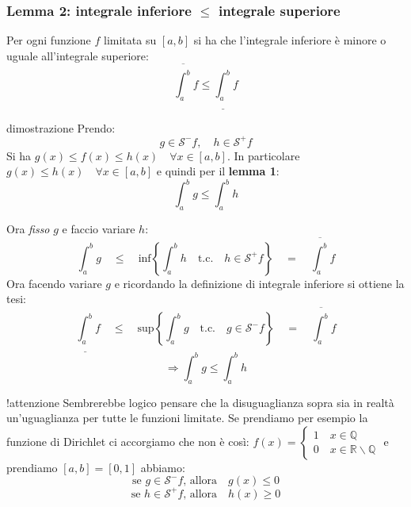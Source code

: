 \documentclass[x11names]{article}
\begin{document}
	\begin{center}
		\colorbox{myred}{\begin{minipage}{5.75in}
				\begin{redes}{}
					\subsubsection{Lemma 2: integrale inferiore $\leq$ integrale superiore}
					Per ogni funzione $f$ limitata su $\left[a,b\right]$ si ha che l'integrale inferiore è minore o uguale all'integrale superiore:
					\[
					\overline{\int_{a}^{b}}f \leq \underline{\int_{a}^{b}}f
					\]
				\end{redes}
		\end{minipage}}        
	\end{center}
	\begin{es}{dimostrazione}
		Prendo:
		\[
		g \in \mathcal{S}^-f, \quad h \in \mathcal{S}^+f
		\]
		Si ha $g(x) \leq f(x) \leq h(x) \quad \forall x \in [a,b]$. In particolare $g(x) \leq h(x) \quad \forall x \in [a,b]$ e quindi per il \textbf{lemma 1}:
		\[
		\int_{a}^{b}g \leq \int_{a}^{b}h 
		\]
		
		Ora \textit{fisso} $g$ e faccio variare $h$:
		\[
		\int_{a}^{b}g \quad \leq \quad \text{inf}\left\{\int_{a}^{b}h \quad \text{t.c.} \quad h \in \mathcal{S}^+f\right\} \quad = \quad \overline{\int_{a}^{b}}f
		\]
		Ora facendo variare $g$ e ricordando la definizione di integrale inferiore si ottiene la tesi:
		\[
		\underline{\int_{a}^{b}}f \quad \leq \quad \text{sup}\left\{\int_{a}^{b}g \quad \text{t.c.} \quad g \in \mathcal{S}^-f\right\} \quad = \quad \overline{\int_{a}^{b}}f
		\]
		\[
		\Longrightarrow 	\int_{a}^{b}g \leq \int_{a}^{b}h 
		\]
		\end{es}
	\begin{es}{}
		\begin{es}{!attenzione}
			Sembrerebbe logico pensare che la disuguaglianza sopra sia in realtà un'uguaglianza per tutte le funzioni limitate.
			Se prendiamo per esempio la funzione di Dirichlet ci accorgiamo che non è così: $f(x) = \begin{cases}
				1 \quad x \in \mathbb{Q} \\
				0 \quad x \in \mathbb{R} \backslash \mathbb{Q}
			\end{cases}$
			e prendiamo $[a,b] = [0,1]$ abbiamo:
			\[
			\text{se } g \in \mathcal{S}^-f \text{, allora} \quad g(x) \leq 0
			\]
			\[
			\text{se } h \in \mathcal{S}^+f \text{, allora} \quad h(x) \geq 0
			\]
		\end{es}
	\end{es}
	
\end{document}
